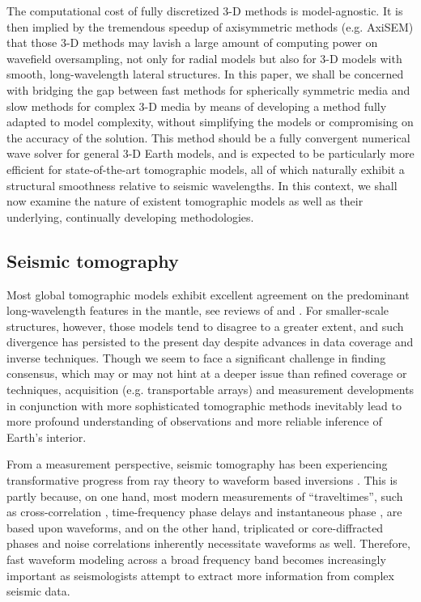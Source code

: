 \documentclass[extra]{gji}
\begin{document}
The computational cost of fully discretized 3-D methods is model-agnostic. 
It is then implied by the tremendous speedup of axisymmetric methods 
(e.g. AxiSEM) that those 3-D methods may lavish a large 
amount of computing power on wavefield oversampling, not only for radial models but 
also for 3-D models with smooth, long-wavelength lateral structures.  
In this paper, we shall be concerned with bridging the gap between 
fast methods for spherically symmetric media and slow methods for
complex 3-D media by means of developing a method fully 
adapted to model complexity, without simplifying the models or 
compromising on the accuracy of the solution.
This method should be a fully convergent numerical wave solver for 
general 3-D Earth models, and is expected to be particularly more efficient 
for state-of-the-art tomographic models, all of which naturally exhibit a structural 
smoothness relative to seismic wavelengths. In this context, we shall
now examine the nature of existent tomographic models as well as their
underlying, continually developing methodologies.

\subsection{Seismic tomography}
\label{sec:tomography}
Most global tomographic models exhibit excellent agreement on the 
predominant long-wavelength features in the mantle,
see reviews of \cite{becker2002comparison} and \cite{auer2014savani}. 
For smaller-scale structures, however, those models tend to disagree to a 
greater extent, and such divergence has persisted to the present day
despite advances in data coverage and inverse techniques. 
Though we seem to face a significant challenge in finding consensus, which 
may or may not hint at a deeper issue than refined coverage or techniques,
acquisition (e.g. transportable arrays) and measurement developments 
in conjunction with more sophisticated tomographic methods
inevitably lead to more profound understanding of observations
and more reliable inference of Earth's interior.

From a measurement perspective, 
seismic tomography has been experiencing transformative progress
from ray theory \cite[]{rawlinson2010seismic} to waveform based
inversions \cite[]{tape2009adjoint, fichtner2008theoretical}. 
This is partly because, on one hand,
most modern measurements of ``traveltimes'', 
such as cross-correlation \cite[Chap 7,][]{nolet2008breviary}, 
time-frequency phase delays \cite[]{fichtner2008theoretical, 
kristekova2009time} and instantaneous phase \cite[]{bozdaug2011misfit}, 
are based upon waveforms,
and on the other hand, triplicated \cite[]{stahler2012triplicated} or 
core-diffracted phases \cite[]{bharadwaj2013enhancing, hosseini2015multifrequency} 
and noise correlations \cite[]{basini2013influence} inherently 
necessitate waveforms as well.
Therefore, fast waveform modeling across a broad frequency band
becomes increasingly important as seismologists attempt to extract  
more information from complex seismic data. 
\end{document}
